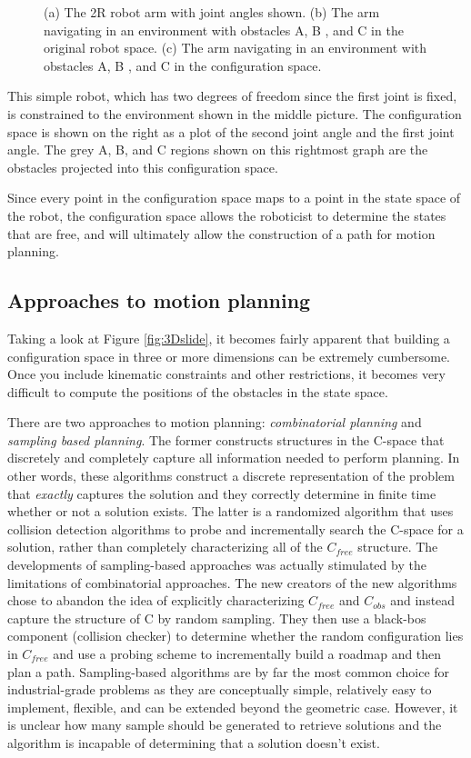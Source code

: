 \documentclass[twoside]{article}
\begin{document}
\begin{figure}[H]
\caption{(a) The 2R robot arm with joint angles shown. (b) The arm navigating in an environment with obstacles A, B , and C in the original robot space.  (c) The arm navigating in an environment with obstacles A, B , and C in the configuration space.}
\label{fig:ConfigSpaceDiff}
\end{figure}

This simple robot, which has two degrees of freedom since the first joint is fixed, is constrained to the environment shown in the middle picture.  The configuration space is shown on the right as a plot of the second joint angle and the first joint angle.  The grey A, B, and C regions shown on this rightmost graph are the obstacles projected into this configuration space.

Since every point in the configuration space maps to a point in the state space of the robot, the configuration space allows the roboticist to determine the states that are free, and will ultimately allow the construction of a path for motion planning.

\subsection{Approaches to motion planning}

Taking a look at Figure \ref{fig:3Dslide}, it becomes fairly apparent that building a configuration space in three or more dimensions can be extremely cumbersome. Once you include kinematic constraints and other restrictions, it becomes very difficult to compute the positions of the obstacles in the state space.

There are two approaches to motion planning: \textit{combinatorial planning} and \textit{sampling based planning}. The former constructs structures in the C-space that discretely and completely capture all information needed to perform planning. In other words, these algorithms construct a discrete representation of the problem that \textit{exactly} captures the solution and they correctly determine in finite time whether or not a solution exists. The latter is a randomized algorithm that uses collision detection algorithms to probe and incrementally search the C-space for a solution, rather than completely characterizing all of the $C_{free}$ structure. The developments of sampling-based approaches was actually stimulated by the limitations of combinatorial approaches. The new creators of the new algorithms chose to abandon the idea of explicitly characterizing $C_{free}$ and $C_{obs}$ and instead capture the structure of C by random sampling. They then use a black-bos component (collision checker) to determine whether the random configuration lies in $C_{free}$ and use a probing scheme to incrementally build a roadmap and then plan a path. Sampling-based algorithms are by far the most common choice for industrial-grade problems as they are conceptually simple, relatively easy to implement, flexible, and can be extended beyond the geometric case. However, it is unclear how many sample should be generated to retrieve solutions and the algorithm is incapable of determining that a solution doesn't exist.
\end{document}
